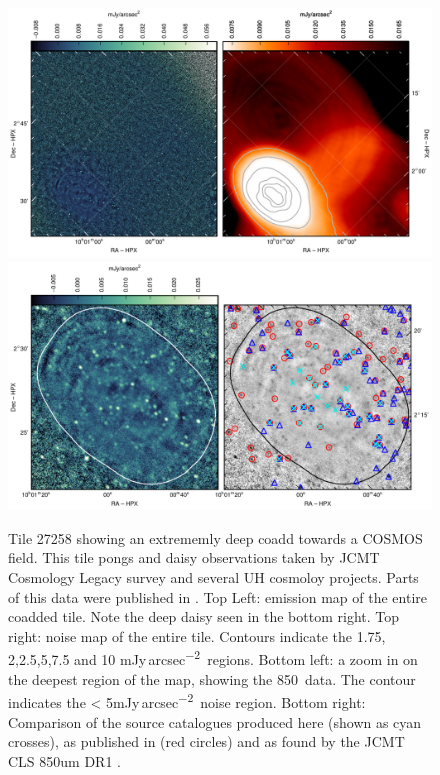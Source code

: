 \documentclass[twocolumn]{aastex6}
\newcommand{\jyas}{Jy\,arcsec\textsuperscript{$-$2}}
\begin{document}
\begin{figure}
  \centering
  \includegraphics{27258-whole-map.pdf}
  \\[3mm]
  \includegraphics{27258-zoomin.pdf}
  \caption{Tile 27258 showing an extrememly deep coadd towards a
    COSMOS field. This tile pongs and daisy observations taken by JCMT
    Cosmology Legacy survey and several UH cosmoloy projects. Parts of
    this data were published in
    \citet{Casey2013,Chen2013,Chen2013a,Geach2016}. Top Left: emission
    map of the entire coadded tile. Note the deep daisy seen in the
    bottom right. Top right: noise map of the entire tile. Contours
    indicate the 1.75, 2,2.5,5,7.5 and 10 m\jyas\ regions. Bottom
    left: a zoom in on the deepest region of the map, showing the
    850\micron\ data. The contour indicates the < 5m\jyas\ noise
    region. Bottom right: Comparison of the source catalogues produced
    here (shown as cyan crosses), as published in \citealt{Casey2013}
    (red circles) and as found by the JCMT CLS 850um DR1 \citep[blue
    triangles]{Geach2016}. }
  \label{fig:t27828}
\end{figure}
\end{document}
